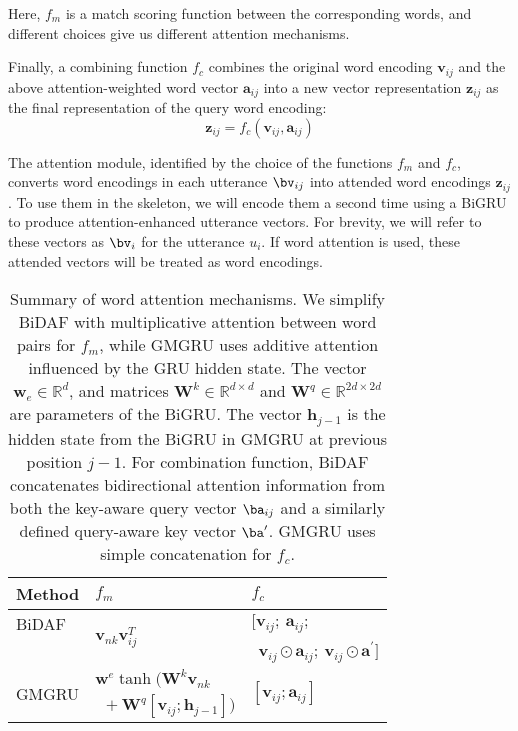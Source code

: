 Here, $f_m$ is a match scoring function between the corresponding
words, and different choices give us different attention mechanisms.

Finally, a combining function $f_{c}$ combines the original word
encoding $\bm{v}_{ij}$ and the above attention-weighted word vector
$\bm{a}_{ij}$ into a new vector representation $\bm{z}_{ij}$ as the final
representation of the query word encoding:
\begin{equation}
\bm{z}_{ij}= f_{c}(\bm{v}_{ij}, \bm{a}_{ij})
\end{equation}

The attention module, identified by the choice of the functions
$f_m$ and $f_c$, converts word encodings in each utterance
$\bv_{ij}$ into attended word encodings $\bm{z}_{ij}$. To use them
in the \HGRU skeleton, we will encode them a second time using a
BiGRU to produce attention-enhanced utterance vectors. For brevity,
we will refer to these vectors as $\bv_i$ for the utterance
$u_i$. If word attention is used, these attended vectors will be
treated as word encodings.


\begin{table}[t]
\caption{\label{tbl:word_att} Summary of word attention mechanisms.
  We simplify BiDAF with multiplicative attention between  word
  pairs for $f_{m}$, while GMGRU uses additive attention
  influenced by the GRU hidden state.
  The vector $\bm{w}_{e} \in\mathbb{R}^{d}$, and matrices
  $\bm{W}^{k}\in \mathbb{R}^{d \times d}$ and
  $\bm{W}^{q} \in\mathbb{R}^{2d \times 2d}$ are parameters of the BiGRU. The vector $\bm{h}_{j-1}$
  is the hidden state from the BiGRU in GMGRU at previous position
  $j-1$.  
  For combination function, BiDAF concatenates bidirectional
  attention information from both the key-aware query vector
  $\ba_{ij}$ and a similarly defined query-aware key vector
  $\ba^{\prime}$. GMGRU uses simple concatenation for $f_c$.}
\begin{center}
  \setlength{\tabcolsep}{3pt}
  {\small
    \begin{tabular}{ll|l}
      \toprule
      Method                 & $f_{m} $                                    & $f_{c}$                                                             \\ \hline
      BiDAF                  & \multirow{2}{*}{$\bm{v}_{nk} {\bm{v}_{ij}^{T}}$}             & $[\bm{v}_{ij};~\bm{a}_{ij};  $                                      \\
                             &                                             & $~~\bm{v}_{ij} \odot \bm{a}_{ij};~\bm{v}_{ij}\odot \bm{a}^{\prime}]$ \\ \hline
      \multirow{2}{*}{GMGRU} & $\bm{w}^{e} \tanh(\bm{W}^{k}\bm{v}_{nk}$    & \multirow{2}{*}{$[\bm{v}_{ij};\bm{a}_{ij}]$}                        \\
                             & $~~+ \bm{W}^{q}[\bm{v}_{ij}; \bm{h}_{j-1}])$ &                                                                     \\ \hline
    \end{tabular}
  }
\end{center}
\end{table}

